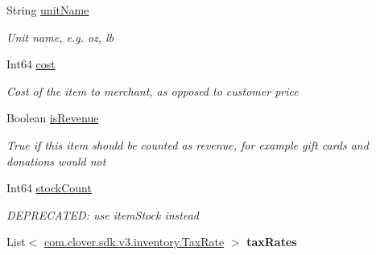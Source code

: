 \begin{DoxyCompactItemize}
String \hyperlink{classcom_1_1clover_1_1sdk_1_1v3_1_1inventory_1_1_item_a3831c28627732a1c99f5c3ecfe8ada43}{unit\+Name}
\begin{DoxyCompactList}\small\item\em Unit name, e.\+g. oz, lb \end{DoxyCompactList}\item 
Int64 \hyperlink{classcom_1_1clover_1_1sdk_1_1v3_1_1inventory_1_1_item_ae6641b1de1f59b1ae077c627f29324d9}{cost}
\begin{DoxyCompactList}\small\item\em Cost of the item to merchant, as opposed to customer price \end{DoxyCompactList}\item 
Boolean \hyperlink{classcom_1_1clover_1_1sdk_1_1v3_1_1inventory_1_1_item_a36d5c01f6ce6ee7385d1f34c3933369a}{is\+Revenue}
\begin{DoxyCompactList}\small\item\em True if this item should be counted as revenue, for example gift cards and donations would not \end{DoxyCompactList}\item 
Int64 \hyperlink{classcom_1_1clover_1_1sdk_1_1v3_1_1inventory_1_1_item_a4949190b359070e62d1c370efcc47fcf}{stock\+Count}
\begin{DoxyCompactList}\small\item\em D\+E\+P\+R\+E\+C\+A\+T\+ED\+: use item\+Stock instead \end{DoxyCompactList}\item 
\mbox{\label{classcom_1_1clover_1_1sdk_1_1v3_1_1inventory_1_1_item_a22ded520de11eba7869f8b7964235c1d}} 
List$<$ \hyperlink{classcom_1_1clover_1_1sdk_1_1v3_1_1inventory_1_1_tax_rate}{com.\+clover.\+sdk.\+v3.\+inventory.\+Tax\+Rate} $>$ {\bfseries tax\+Rates}
\item 
\mbox{\label{classcom_1_1clover_1_1sdk_1_1v3_1_1inventory_1_1_item_a1661611e4da6946eea0092d541564758}} 

\end{DoxyCompactItemize}
